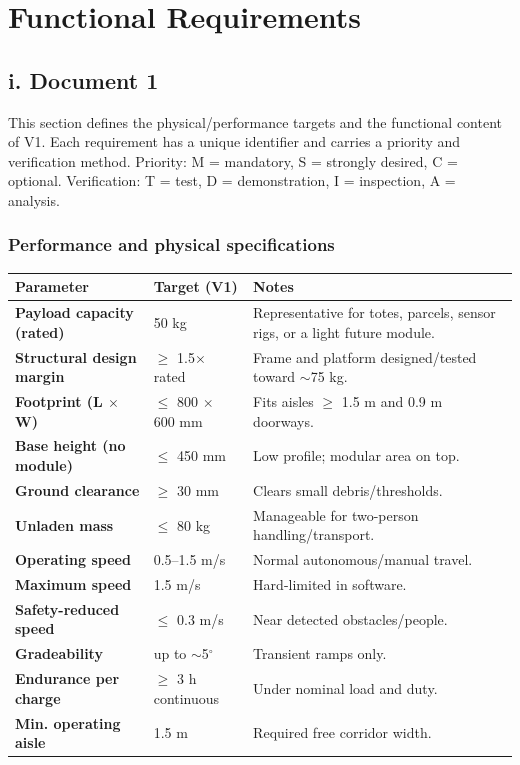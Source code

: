 \chapter{Functional Requirements}

\section*{i. Document 1}

This section defines the physical/performance targets and the functional content of V1. Each requirement has a unique identifier and carries a priority and verification method. Priority: M = mandatory, S = strongly desired, C = optional. Verification: T = test, D = demonstration, I = inspection, A = analysis.

\subsection*{Performance and physical specifications}

\begin{table}[H]
\centering
\begin{tabularx}{\textwidth}{>{\bfseries}L{0.28\textwidth}L{0.22\textwidth}Y}
\toprule
Parameter & Target (V1) & Notes \\
\midrule
Payload capacity (rated) & 50 kg & Representative for totes, parcels, sensor rigs, or a light future module. \\
Structural design margin & $\geq$ 1.5$\times$ rated & Frame and platform designed/tested toward $\sim$75 kg. \\
Footprint (L $\times$ W) & $\leq$ 800 $\times$ 600 mm & Fits aisles $\geq$ 1.5 m and 0.9 m doorways. \\
Base height (no module) & $\leq$ 450 mm & Low profile; modular area on top. \\
Ground clearance & $\geq$ 30 mm & Clears small debris/thresholds. \\
Unladen mass & $\leq$ 80 kg & Manageable for two-person handling/transport. \\
Operating speed & 0.5--1.5 m/s & Normal autonomous/manual travel. \\
Maximum speed & 1.5 m/s & Hard-limited in software. \\
Safety-reduced speed & $\leq$ 0.3 m/s & Near detected obstacles/people. \\
Gradeability & up to $\sim$5$^\circ$ & Transient ramps only. \\
Endurance per charge & $\geq$ 3 h continuous & Under nominal load and duty. \\
Min. operating aisle & 1.5 m & Required free corridor width. \\
\bottomrule
\end{tabularx}
\end{table}

